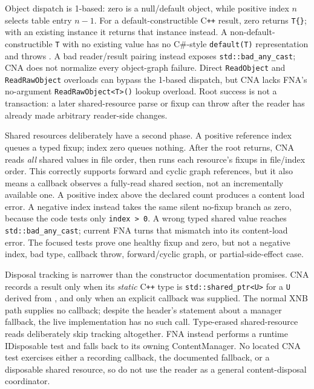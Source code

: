 Object dispatch is 1-based: zero is a null/default object, while positive index $n$ selects table
entry $n-1$. For a default-constructible C\texttt{++} result, zero returns \texttt{T\{\}}; with
an existing instance it returns that instance instead. A non-default-constructible \texttt{T}
with no existing value has no C\#-style \texttt{default(T)} representation and throws
. A bad reader/result pairing instead exposes
\texttt{std::bad\_any\_cast}; CNA does not normalize every object-graph failure. Direct
\texttt{ReadObject} and \texttt{ReadRawObject} overloads can bypass the 1-based dispatch, but
CNA lacks FNA's no-argument \texttt{ReadRawObject<T>()} lookup overload. Root success is not a
transaction: a later shared-resource parse or fixup can throw after the reader has already made
arbitrary reader-side changes.

Shared resources deliberately have a second phase. A positive reference index queues a typed
fixup; index zero queues nothing. After the root returns, CNA reads \emph{all} shared values in
file order, then runs each resource's fixups in file/index order. This correctly supports forward
and cyclic graph references, but it also means a callback observes a fully-read shared section,
not an incrementally available one. A positive index above the declared count produces a content
load error. A negative index instead takes the same silent no-fixup branch as zero, because the
code tests only \texttt{index > 0}. A wrong typed shared value reaches
\texttt{std::bad\_any\_cast}; current FNA turns that mismatch into its content-load error. The
focused tests prove one healthy fixup and zero, but not a negative index, bad type, callback
throw, forward/cyclic graph, or partial-side-effect case.

Disposal tracking is narrower than the constructor documentation promises. CNA records a result
only when its \emph{static} C\texttt{++} type is \texttt{std::shared\_ptr<U>} for a
\texttt{U} derived from , and only when an explicit callback was supplied.
The normal  XNB path supplies no callback; despite the header's statement
about a manager fallback, the live implementation has no such call. Type-erased shared-resource
reads deliberately skip tracking altogether. FNA instead performs a runtime IDisposable test and
falls back to its owning ContentManager. No located CNA test exercises either a recording callback,
the documented fallback, or a disposable shared resource, so do not use the reader as a general
content-disposal coordinator.

